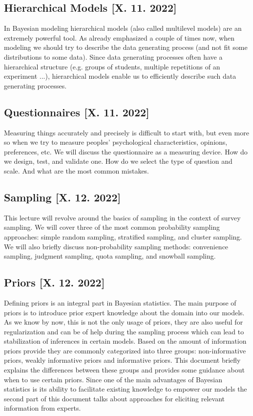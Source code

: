 \documentclass[fleqn,moreauthors,10pt]{ds_report}
\begin{document}
\subsection*{Hierarchical Models [X. 11. 2022]}

In Bayesian modeling hierarchical models (also called multilevel models) are an extremely powerful tool. As already emphasized a couple of times now, when modeling we should try to describe the data generating process (and not fit some distributions to some data). Since data generating processes often have a hierarchical structure (e.g. groups of students, multiple repetitions of an experiment ...), hierarchical models enable us to efficiently describe such data generating processes.

\subsection*{Questionnaires [X. 11. 2022]}

Measuring things accurately and precisely is difficult to start with, but even more so when we try to measure peoples' psychological characteristics, opinions, preferences, etc. We will discuss the questionnaire as a measuring device. How do we design, test, and validate one. How do we select the type of question and scale. And what are the most common mistakes.

\subsection*{Sampling [X. 12. 2022]}

This lecture will revolve around the basics of sampling in the context of survey sampling. We will cover three of the most common probability sampling approaches: simple random sampling, stratified sampling, and cluster sampling. We will also briefly discuss non-probability sampling methods: convenience sampling, judgment sampling, quota sampling, and snowball sampling.

\subsection*{Priors [X. 12. 2022]}

Defining priors is an integral part in Bayesian statistics. The main purpose of priors is to introduce prior expert knowledge about the domain into our models. As we know by now, this is not the only usage of priors, they are also useful for regularization and can be of help during the sampling process which can lead to stabilization of inferences in certain models. Based on the amount of information priors provide they are commonly categorized into three groups: non-informative priors, weakly informative priors and informative priors. This document briefly explains the differences between these groups and provides some guidance about when to use certain priors. Since one of the main advantages of Bayesian statistics is its ability to facilitate existing knowledge to empower our models the second part of this document talks about approaches for eliciting relevant information from experts.
\end{document}
